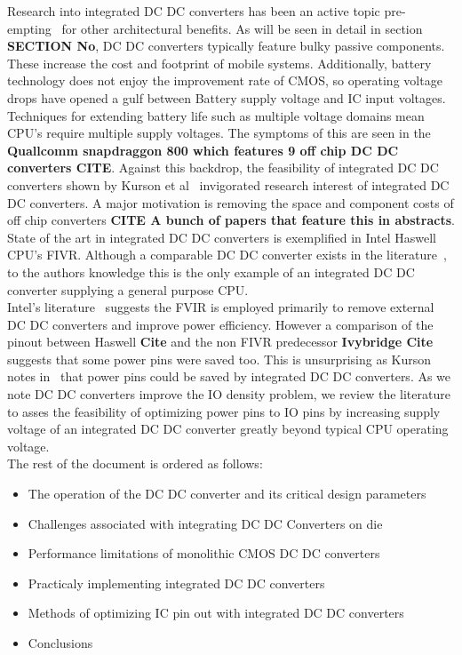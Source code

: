 \documentclass[letterpaper,twocolumn,10pt]{article}
\begin{document}
\indent Research into integrated DC DC converters has been an active topic pre-empting~\cite{Chang2010} for other architectural benefits. As will be seen in detail in section \textbf{SECTION No}, DC DC converters typically feature bulky passive components. These increase the cost and footprint of mobile systems. Additionally, battery technology does not enjoy the improvement rate of CMOS, so operating voltage drops have opened a gulf between Battery supply voltage and IC input voltages. Techniques for extending battery life such as multiple voltage domains mean CPU's require multiple supply voltages. The symptoms of this are seen in the \textbf{Quallcomm snapdraggon 800 which features 9 off chip DC DC converters CITE}. Against this backdrop, the feasibility of integrated DC DC converters shown by Kurson et al~\cite{Kurson2003} invigorated research interest of integrated DC DC converters. A major motivation is removing the space and component costs of off chip converters \textbf{CITE A bunch of papers that feature this in abstracts}.\\
\indent State of the art in integrated DC DC converters is exemplified in Intel Haswell CPU's FIVR. Although a comparable DC DC converter exists in the literature~\cite{Sturcken2012}, to the authors knowledge this is the only example of an integrated DC DC converter supplying a general purpose CPU.\\
Intel's literature~\cite{Intel2010} %
suggests the FVIR is employed primarily to remove external DC DC converters and improve power efficiency. However a comparison of the pinout between Haswell \textbf{Cite} and the non FIVR predecessor \textbf{Ivybridge Cite} suggests that some power pins were saved too. This is unsurprising as Kurson notes in~\cite{Kurson2003} that power pins could be saved by integrated DC DC converters. As we note DC DC converters improve the IO density problem, we review the literature to asses the feasibility of optimizing power pins to IO pins by increasing supply voltage of an integrated DC DC converter greatly beyond typical CPU operating voltage.\\
\indent The rest of the document is ordered as follows:\\
\begin{itemize}
\item{The operation of the DC DC converter and its critical design parameters}
\item{Challenges associated with integrating DC DC Converters on die}
\item{Performance limitations of monolithic CMOS DC DC converters}
\item{Practicaly implementing integrated DC DC converters}
\item{Methods of optimizing IC pin out with integrated DC DC converters}
\item{Conclusions}
\end{itemize}
 
\end{document}
